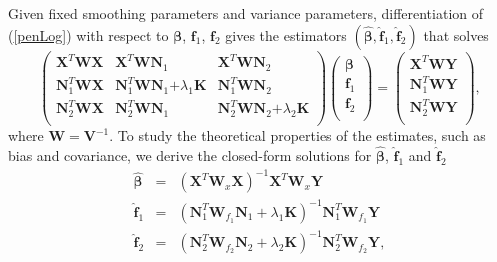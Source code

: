 \documentclass[article,lineno]{biometrika}
\begin{document}
Given fixed smoothing parameters and variance parameters, differentiation of (\ref{penLog}) with respect to $\boldsymbol \beta$, $\boldsymbol f_1$, $\boldsymbol f_2$ gives the estimators 
$(\boldsymbol {\hat \beta}, \boldsymbol {\hat f}_1, \boldsymbol {\hat f}_2)$ that solves
\begin{equation} \label{normalMatrix}
 \begin{pmatrix}
  \boldsymbol X^T  \boldsymbol W \boldsymbol X & \boldsymbol X^T  \boldsymbol W \boldsymbol N_1 & \boldsymbol X^T  \boldsymbol W \boldsymbol N_2 \\
   \boldsymbol N_1^T  \boldsymbol W\boldsymbol X & \boldsymbol N_1^T  \boldsymbol W \boldsymbol N_1 \boldsymbol 
 + \lambda_1 \boldsymbol K &  \boldsymbol N_1^T  \boldsymbol W \boldsymbol N_2  \\
  \boldsymbol N_2^T  \boldsymbol W\boldsymbol X &  \boldsymbol N_2^T  \boldsymbol W \boldsymbol N_1 & \boldsymbol N_2^T  \boldsymbol W \boldsymbol N_2 \boldsymbol 
 +
  \lambda_2 \boldsymbol K \\
 \end{pmatrix}
  \begin{pmatrix}
   \boldsymbol \beta \\
 \boldsymbol f_1 \\
 \boldsymbol f_2\\
 \end{pmatrix}
  =
 \begin{pmatrix}
   \boldsymbol X^T  \boldsymbol W \boldsymbol Y \\
   \boldsymbol N_1^T  \boldsymbol W \boldsymbol Y  \\
  \boldsymbol N_2^T  \boldsymbol W \boldsymbol Y  \\
 \end{pmatrix},
 \end{equation}
where $\boldsymbol W = \boldsymbol V^{-1}$.
To study the theoretical properties of the estimates, such as bias and covariance, we derive the closed-form solutions  for $\boldsymbol {\hat \beta}$, $\boldsymbol {\hat f}_1$ and $\boldsymbol {\hat f}_2$
\begin{eqnarray}
 \boldsymbol {\hat \beta} 
  &=&
 (\boldsymbol X^T  \boldsymbol W_x \boldsymbol X )^{-1} \boldsymbol X^T  \boldsymbol W_x \boldsymbol Y 
\label{betaHat} \\
 \boldsymbol {\hat f}_1
   &=&
  (\boldsymbol N_1^T 
\boldsymbol W_{f_1}  \boldsymbol N_1
  + \lambda_1 \boldsymbol K)^{-1}  \boldsymbol N_1^T \boldsymbol W_{f_1} \boldsymbol Y
\label{f1Hat} \\
  \boldsymbol {\hat f}_2 
  &=&
 (\boldsymbol N_2^T 
\boldsymbol W_{f_2}  \boldsymbol N_2
  + \lambda_2 \boldsymbol K)^{-1}  \boldsymbol N_2^T \boldsymbol W_{f_2} \boldsymbol Y,
\label{f2Hat}
\end{eqnarray}
\end{document}
